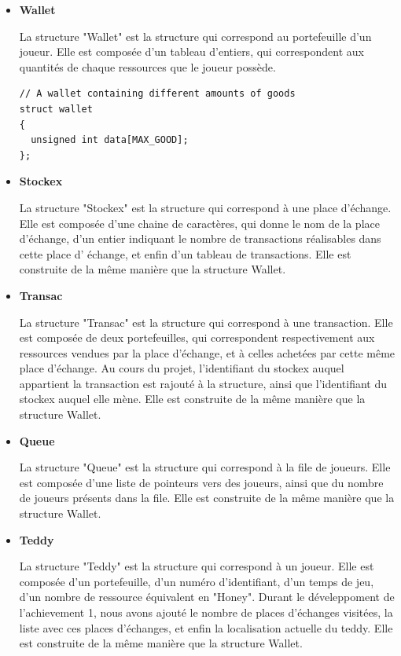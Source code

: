 \documentclass{article}
\begin{document}
\begin{itemize}

\item\textbf{Wallet}

La structure "Wallet" est la structure qui correspond au portefeuille d'un joueur.
Elle est compos\'ee d'un tableau d'entiers, qui correspondent aux quantit\'es de chaque ressources que le joueur poss\`ede.


\begin{lstlisting}[style=xslt]
// A wallet containing different amounts of goods
struct wallet 
{
  unsigned int data[MAX_GOOD];
};
\end{lstlisting}

\item\textbf{Stockex}

La structure "Stockex" est la structure qui correspond \`a une place d'\'echange.
Elle est compos\'ee d'une chaine de caract\`eres, qui donne le nom de la place d'\'echange, d'un entier indiquant le nombre de transactions r\'ealisables dans cette place d'
\'echange,
et enfin d'un tableau de transactions.
Elle est construite de la m\^eme mani\`ere que la structure Wallet.

\item\textbf{Transac}

La structure "Transac" est la structure qui correspond \`a une transaction.
Elle est compos\'ee de deux portefeuilles, qui correspondent respectivement aux ressources vendues par la place d'\'echange, et \`a celles achet\'ees par cette m\^eme place d'\'echange.
Au cours du projet, l'identifiant du stockex auquel appartient la transaction est rajouté \`a la structure, ainsi que l'identifiant du stockex auquel elle m\`ene. 
Elle est construite de la m\^eme mani\`ere que la structure Wallet.

\item\textbf{Queue}

La structure "Queue" est la structure qui correspond \`a la file de joueurs.
Elle est compos\'ee d'une liste de pointeurs vers des joueurs, ainsi que du nombre de joueurs pr\'esents dans la file. 
Elle est construite de la m\^eme mani\`ere que la structure Wallet.

\item\textbf{Teddy}

La structure "Teddy" est la structure qui correspond \`a un joueur.
Elle est compos\'ee d'un portefeuille, d'un num\'ero d'identifiant, d'un temps de jeu, d'un nombre de ressource \'equivalent en "Honey".
Durant le d\'eveleppoment de l'achievement 1, nous avons ajout\'e le nombre de places d'\'echanges visit\'ees, la liste avec ces places d'\'echanges, et enfin la localisation actuelle du teddy.
Elle est construite de la m\^eme mani\`ere que la structure Wallet.

\end{itemize}
\end{document}
